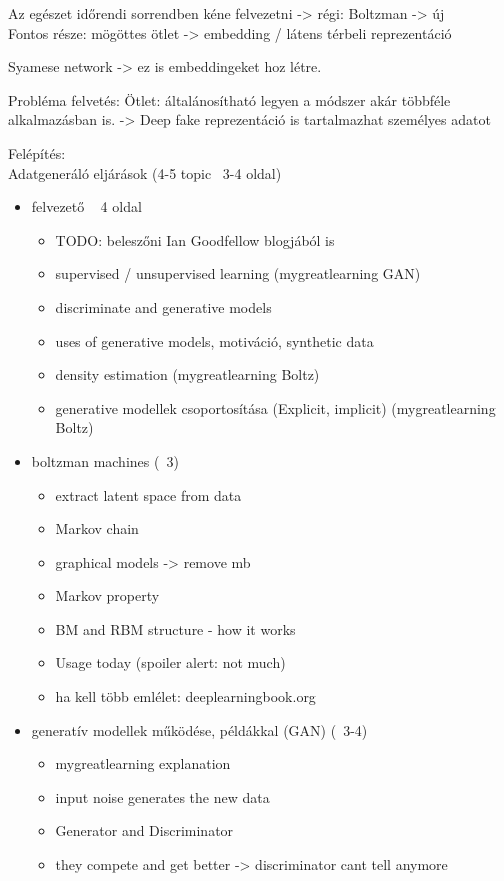 Az egészet időrendi sorrendben kéne felvezetni -> régi: Boltzman -> új \\
Fontos része: mögöttes ötlet -> embedding / látens térbeli reprezentáció

Syamese network -> ez is embeddingeket hoz létre.

Probléma felvetés:
Ötlet: általánosítható legyen a módszer akár többféle alkalmazásban is. -> Deep fake reprezentáció is tartalmazhat személyes adatot

Felépítés: \\
Adatgeneráló eljárások (4-5 topic ~3-4 oldal)
\begin{itemize}
	\item felvezető ~ 4 oldal 
	\begin{itemize}
		\item TODO: beleszőni Ian Goodfellow blogjából is
		\item supervised / unsupervised learning (mygreatlearning GAN)
		\item discriminate and generative models
		\item uses of generative models, motiváció, synthetic data
		\item density estimation (mygreatlearning Boltz)
		\item generative modellek csoportosítása (Explicit, implicit) (mygreatlearning Boltz)
	\end{itemize}
	\item boltzman machines (~3)
	\begin{itemize}
		\item extract latent space from data
		\item Markov chain
		\item graphical models -> remove mb
		\item Markov property
		\item BM and RBM structure - how it works
		\item Usage today (spoiler alert: not much)
		\item ha kell több emlélet: deeplearningbook.org
	\end{itemize}
	\item generatív modellek működése, példákkal (GAN) (~3-4)
	\begin{itemize}
		\item mygreatlearning explanation
		\item input noise generates the new data
		\item Generator and Discriminator
		\item they compete and get better -> discriminator cant tell anymore

\end{itemize}
\end{itemize}
